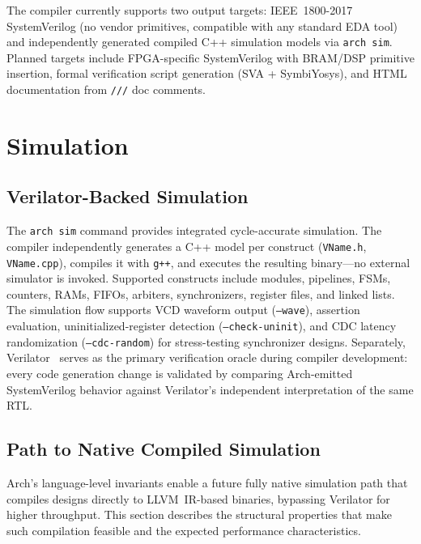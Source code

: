 \documentclass[11pt,twocolumn]{article}
\begin{document}
The compiler currently supports two output targets:
IEEE~1800-2017 SystemVerilog (no vendor primitives, compatible with any standard EDA tool) and
independently generated compiled C++ simulation models via \texttt{arch sim}.
Planned targets include FPGA-specific SystemVerilog with BRAM/DSP primitive insertion, formal verification script generation (SVA + SymbiYosys), and HTML documentation from \texttt{///} doc comments.

\section{Simulation}\label{sec:sim}

\subsection{Verilator-Backed Simulation}

The \texttt{arch sim} command provides integrated cycle-accurate simulation. The compiler independently generates a C++ model per construct (\texttt{VName.h}, \texttt{VName.cpp}), compiles it with \texttt{g++}, and executes the resulting binary---no external simulator is invoked. Supported constructs include modules, pipelines, FSMs, counters, RAMs, FIFOs, arbiters, synchronizers, register files, and linked lists. The simulation flow supports VCD waveform output (\texttt{--wave}), assertion evaluation, uninitialized-register detection (\texttt{--check-uninit}), and CDC latency randomization (\texttt{--cdc-random}) for stress-testing synchronizer designs. Separately, Verilator~\cite{verilator} serves as the primary verification oracle during compiler development: every code generation change is validated by comparing Arch-emitted SystemVerilog behavior against Verilator's independent interpretation of the same RTL.

\subsection{Path to Native Compiled Simulation}

Arch's language-level invariants enable a future fully native simulation path that compiles designs directly to LLVM~IR-based binaries, bypassing Verilator for higher throughput. This section describes the structural properties that make such compilation feasible and the expected performance characteristics.
\end{document}
